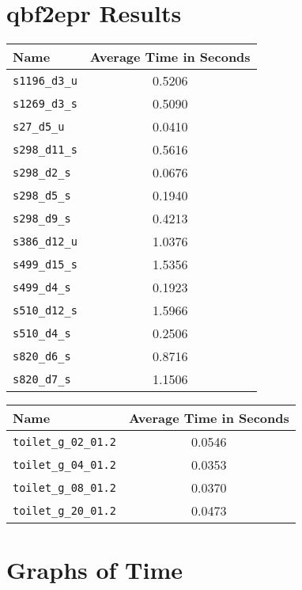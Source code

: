 \section{qbf2epr Results}

\begin{center}
\begin{tabular}{| l | S[table-format=3.2] |}
\hline
\textbf{Name} & \textbf{Average Time in Seconds} \\ \hline
\texttt{s1196\_d3\_u} & 0.5206 \\
\texttt{s1269\_d3\_s} & 0.5090 \\
\texttt{s27\_d5\_u} & 0.0410 \\
\texttt{s298\_d11\_s} & 0.5616 \\
\texttt{s298\_d2\_s} & 0.0676 \\
\texttt{s298\_d5\_s} & 0.1940 \\
\texttt{s298\_d9\_s} & 0.4213 \\
\texttt{s386\_d12\_u} & 1.0376 \\
\texttt{s499\_d15\_s} & 1.5356 \\
\texttt{s499\_d4\_s} &  0.1923\\
\texttt{s510\_d12\_s} & 1.5966 \\
\texttt{s510\_d4\_s} & 0.2506 \\
\texttt{s820\_d6\_s} & 0.8716 \\
\texttt{s820\_d7\_s} & 1.1506 \\
\hline
\end{tabular}
\end{center}

\begin{center}
\begin{tabular}{| l | c |}
\hline
\textbf{Name} & \textbf{Average Time in Seconds} \\ \hline
\texttt{toilet\_g\_02\_01.2} & 0.0546 \\
\texttt{toilet\_g\_04\_01.2} & 0.0353 \\
\texttt{toilet\_g\_08\_01.2} & 0.0370 \\
\texttt{toilet\_g\_20\_01.2} & 0.0473 \\
\hline
\end{tabular}
\end{center}

\section{Graphs of Time}

\begin{center}

\end{center}

\begin{center}

\end{center}
